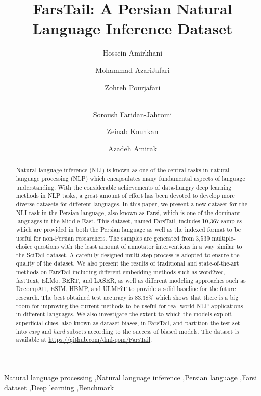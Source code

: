 \documentclass[preprint,12pt]{elsarticle}
\begin{document}
\begin{frontmatter}





\title{FarsTail: A Persian Natural Language Inference Dataset}



\author{Hossein Amirkhani} 
\author{Mohammad AzariJafari}
\author{Zohreh Pourjafari}\author{\\Soroush Faridan-Jahromi}\author{Zeinab Kouhkan}\author{Azadeh Amirak}\address{Computer Engineering and IT Department, University of Qom, Iran}
\begin{abstract}
Natural language inference (NLI) is known as one of the central tasks in natural language processing (NLP) which encapsulates many fundamental aspects of language understanding. With the considerable achievements of data-hungry deep learning methods in NLP tasks, a great amount of effort has been devoted to develop more diverse datasets for different languages. In this paper, we present a new dataset for the NLI task in the Persian language, also known as Farsi, which is one of the dominant languages in the Middle East. This dataset, named FarsTail, includes 10,367 samples which are provided in both the Persian language as well as the indexed format to be useful for non-Persian researchers. The samples are generated from 3,539 multiple-choice questions with the least amount of annotator interventions in a way similar to the SciTail dataset. A carefully designed multi-step process is adopted to ensure the quality of the dataset. We also present the results of traditional and state-of-the-art methods on FarsTail including different embedding methods such as word2vec, fastText, ELMo, BERT, and LASER, as well as different modeling approaches such as DecompAtt, ESIM, HBMP, and ULMFiT
to provide a solid baseline for the future research. The best obtained test accuracy is 83.38\% which shows that there is a big room for improving the current methods to be useful for real-world NLP applications in different languages. We also investigate the extent to which the models exploit superficial clues, also known as dataset biases, in FarsTail, and partition the test set into \textit{easy} and \textit{hard} subsets according to the success of biased models. The dataset is available at \url{https://github.com/dml-qom/FarsTail}. 
\end{abstract}





\begin{keyword}
Natural language processing \sep Natural language inference \sep Persian language \sep Farsi dataset \sep Deep learning \sep Benchmark




\end{keyword}


\end{frontmatter}
\end{document}
